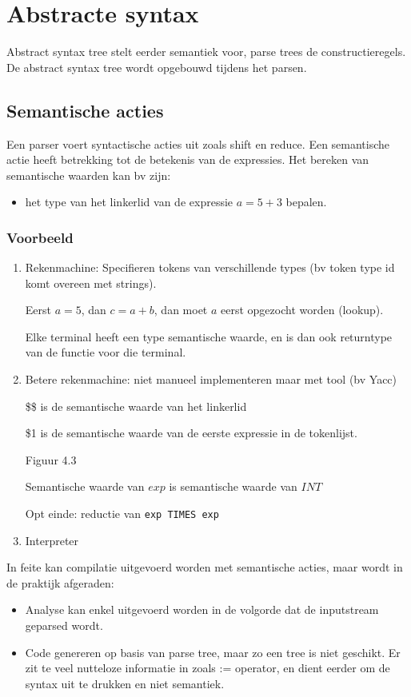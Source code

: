 \chapter{Abstracte syntax}
\label{ch:abstract_syntax}
Abstract syntax tree stelt eerder semantiek voor, parse trees de constructieregels. De abstract syntax tree wordt opgebouwd tijdens het parsen.
\section{Semantische acties}


Een parser voert syntactische acties uit zoals shift en reduce. Een semantische actie heeft betrekking tot de betekenis van de expressies. Het bereken van semantische waarden kan bv zijn:
\begin{itemize}
	\item het type van het linkerlid van de expressie $a = 5 + 3$ bepalen.
\end{itemize}


\subsection{Voorbeeld}
\begin{enumerate}
	\item Rekenmachine: Specifieren tokens van verschillende types (bv token type id komt overeen met strings). 
	
	Eerst $a = 5$, dan $c = a + b$, dan moet $a$ eerst opgezocht worden (lookup).
	
	Elke terminal heeft een type semantische waarde, en is dan ook returntype van de functie voor die terminal.
	
	
	\item Betere rekenmachine: niet manueel implementeren maar met tool (bv Yacc)
	
	\$\$ is de semantische waarde van het linkerlid
	
	\$1 is de semantische waarde van de eerste expressie in de tokenlijst.
	
	Figuur 4.3
	
	Semantische waarde van $exp$ is semantische waarde van $INT$
	
	Opt einde: reductie van \texttt{exp TIMES exp}
	\item Interpreter
\end{enumerate}
In feite kan compilatie uitgevoerd worden met semantische acties, maar wordt in de praktijk afgeraden:
\begin{itemize}
	\item Analyse kan enkel uitgevoerd worden in de volgorde dat de inputstream geparsed wordt. 
	\item Code genereren op basis van parse tree, maar zo een tree is niet geschikt. Er zit te veel nutteloze informatie in zoals := operator, en dient eerder om de syntax uit te drukken en niet semantiek.
\end{itemize}

